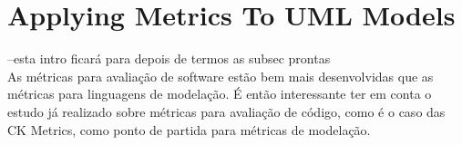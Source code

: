\section{Applying Metrics To UML Models}\label{metrics}

--esta intro ficará para depois de termos as subsec prontas\\


As métricas para avaliação de  software estão bem mais desenvolvidas que as métricas para linguagens de modelação. É então interessante ter em conta o estudo já realizado sobre métricas para avaliação de código, como é o caso das CK Metrics, como ponto de partida para métricas de modelação.\\










